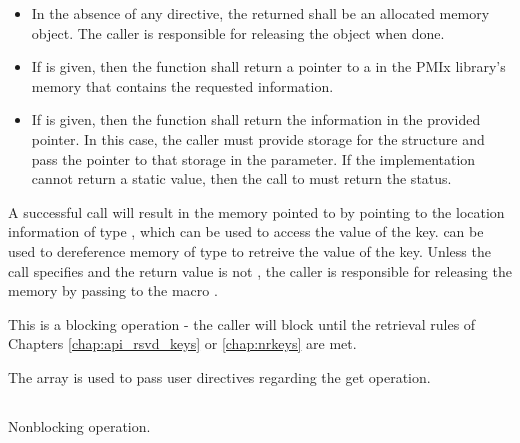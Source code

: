 \begin{itemize}
    \item In the absence of any directive, the returned  shall be an allocated memory object. The caller is responsible for releasing the object when done.
    \item If  is given, then the function shall return a pointer to a  in the \ac{PMIx} library's memory that contains the requested information.
    \item If  is given, then the function shall return the information in the provided  pointer. In this case, the caller must provide storage for the structure and pass the pointer to that storage in the  parameter. If the implementation cannot return a static value, then the call to  must return the  status.
\end{itemize}

A successful call will result in the memory pointed to by  pointing to the location information of type , which can be used to access the value of the key.  
can be used to dereference memory of type  to retreive the value of the key. 
Unless the call specifies  and the return value is not , the caller is responsible for releasing the memory by passing  to the macro  
.  

This is a blocking operation - the caller will block until the retrieval rules of Chapters \ref{chap:api_rsvd_keys} or \ref{chap:nrkeys} are met.

The  array is used to pass user directives regarding the get operation.

\subsection{}

\summary

Nonblocking  operation.

\format


